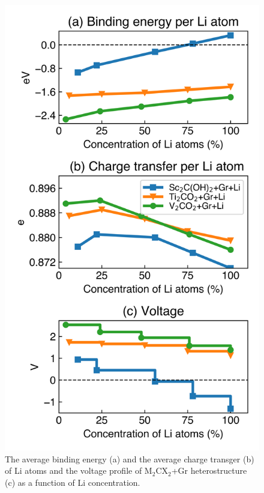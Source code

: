 \begin{figure}[htbp]
\centering
\includegraphics[width=0.6\linewidth]{Li_con.png}%
\caption{The average binding energy (a) and the average charge transger (b) of Li atoms and the voltage profile of M$_2$CX$_2$+Gr heterostructure (c) as a function of Li concentration. \label{concenration}}
\end{figure}

